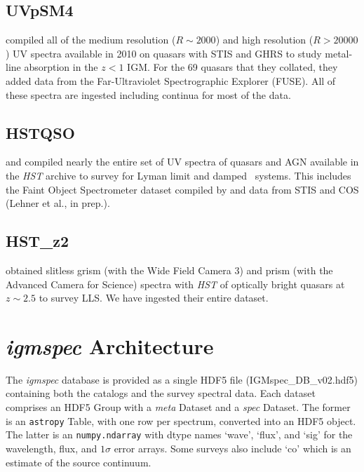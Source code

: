 \documentclass[12pt]{elsarticle}
\begin{document}
\subsection{UVpSM4}
\label{sec:hstmetals}

\cite{ctp+10,cpt+11} compiled all of the medium
resolution ($R \sim 2000$) and high resolution
($R > 20000$) UV spectra available in 2010 on
quasars with STIS and GHRS to
study metal-line absorption in the $z<1$ IGM.
For the 69 quasars that they collated, they added
data from the Far-Ultraviolet
Spectrographic Explorer (FUSE).
All of these spectra are ingested including
continua for most of the data.

\subsection{HSTQSO}
\label{sec:hstqso}

\cite{ribaudo11} and \cite{neeleman+16}
compiled nearly the entire set of UV spectra of
quasars and AGN available in the {\it HST} archive
to survey for Lyman limit and damped \lya\ systems.
This includes the Faint Object Spectrometer dataset
compiled by \cite{bechtold02} and data from STIS
and COS (Lehner et al., in prep.).

\subsection{HST\_z2}
\label{sec:hstz2}

\cite{omeara11,omeara13} obtained slitless grism
(with the Wide Field Camera 3) and prism (with the
Advanced Camera for Science) spectra with {\it HST}
of optically bright quasars at $z \sim 2.5$
to survey LLS.  We have ingested their entire dataset.

\section{{\it igmspec} Architecture}
\label{sec:arch}

The {\it igmspec} database is provided as a single HDF5 file
(IGMspec\_DB\_v02.hdf5)
containing both the catalogs and the survey spectral data.  
Each dataset comprises an HDF5 Group
with a {\it meta} Dataset and a {\it spec} Dataset.
The former is an {\tt astropy} Table, with one row per
spectrum, converted into an HDF5 object.
The latter is an {\tt numpy.ndarray} 
with dtype names `wave', `flux', and `sig' for the
wavelength, flux, and $1\sigma$ error arrays.
Some surveys also include `co' which is an estimate of the source
continuum.  
\end{document}
